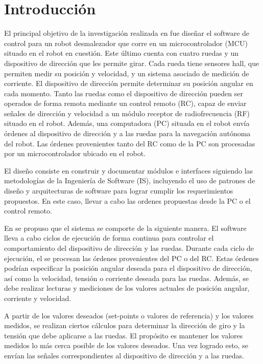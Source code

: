 \chapter{Introducción}

El principal objetivo de la investigación realizada en \cite{laura} fue diseñar el software de control para un robot desmalezador que corre en un microcontrolador (MCU) situado en el robot en cuestión. Este último cuenta con cuatro ruedas y un dispositivo de dirección que les permite girar. Cada rueda tiene sensores \gls{hall}, que permiten medir su posición y velocidad, y un sistema asociado de medición de corriente. El dispositivo de dirección permite determinar su posición angular en cada momento. Tanto las ruedas como el dispositivo de dirección pueden ser operados de forma remota mediante un control remoto (RC), capaz de enviar señales de dirección y velocidad a un módulo receptor de radiofrecuencia (RF) situado en el robot. Además, una computadora (PC) situada en el robot envía órdenes al dispositivo de dirección y a las ruedas para la navegación autónoma del robot. Las órdenes provenientes tanto del RC como de la PC son procesadas por un microcontrolador ubicado en el robot.

El diseño consiste en construir y documentar módulos e interfaces siguiendo las metodologías de la Ingeniería de Software (IS), incluyendo el uso de patrones de diseño y arquitecturas de software para lograr cumplir los requerimientos propuestos. En este caso, llevar a cabo las ordenes propuestas desde la PC o el control remoto.

En \cite{laura} se propuso que el sistema se comporte de la siguiente manera. El software lleva a cabo ciclos de ejecución de forma continua para controlar el comportamiento del dispositivo de dirección y las ruedas. Durante cada ciclo de ejecución, el se procesan las órdenes provenientes del PC o del RC. Estas órdenes podrían especificar la posición angular deseada para el dispositivo de dirección, así como la velocidad, tensión o corriente deseada para las ruedas. Además, se debe realizar lecturas y mediciones de los valores actuales de posición angular, corriente y velocidad.

A partir de los valores deseados (set-points o valores de referencia) y los valores medidos, se realizan ciertos cálculos para determinar la dirección de giro y la tensión que debe aplicarse a las ruedas. El propósito es mantener los valores medidos lo más cerca posible de los valores deseados. Una vez logrado esto, se envían las señales correspondientes al dispositivo de dirección y a las ruedas.


